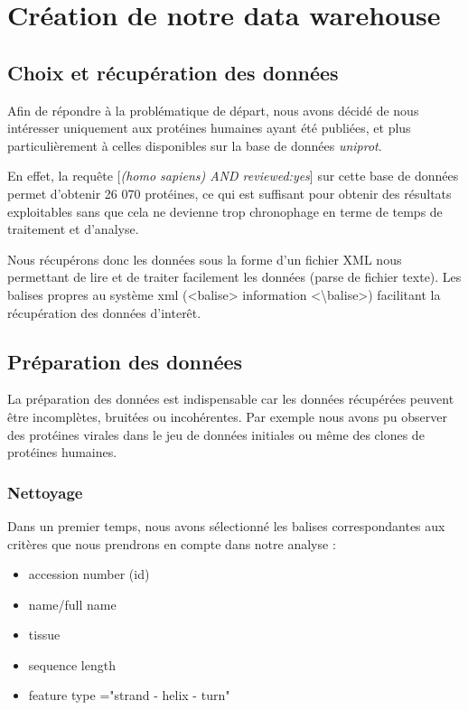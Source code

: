 \section*{Création de notre data warehouse}

\subsection*{Choix et récupération des données}


Afin de répondre à la problématique de départ, nous avons décidé de nous intéresser uniquement aux protéines humaines ayant été publiées, et plus particulièrement à celles disponibles sur la base de données \emph{uniprot}.

En effet, la requête [\emph{(homo sapiens) AND reviewed:yes}] sur cette base de données permet d'obtenir 26 070 protéines, ce qui est suffisant pour obtenir des résultats exploitables sans que cela ne devienne trop chronophage en terme de temps de traitement et d'analyse.

Nous récupérons donc les données sous la forme d'un fichier XML nous permettant de lire et de traiter facilement les données (parse de fichier texte). Les balises propres au système xml (<balise> information <\textbackslash balise>) facilitant la récupération des données d'inter\^et.

\subsection*{Préparation des données}

La préparation des données est indispensable car les données récupérées peuvent être incomplètes, bruitées ou incohérentes. Par exemple nous avons pu observer des protéines virales dans le jeu de données initiales ou même des clones de protéines humaines.

\subsubsection*{Nettoyage}
Dans un premier temps, nous avons sélectionné les balises correspondantes aux critères que nous prendrons en compte dans notre analyse :
\renewcommand\labelitemi{\textbullet}
\begin{itemize}
\item accession number (id)
\item name/full name
\item tissue
\item sequence length
\item feature type ="strand  - helix - turn"\\
\end{itemize}

